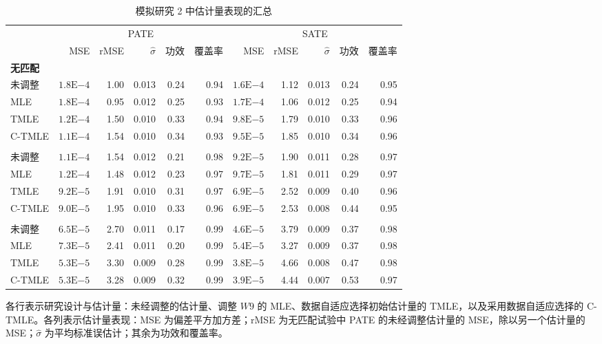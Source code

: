 \begin{table}[htbp]
 \centering
 \caption{模拟研究 2 中估计量表现的汇总}
 \label{tab:ch13-study2}
 \begingroup
 \small
 \setlength{\tabcolsep}{3pt}
 \renewcommand{\arraystretch}{1.16}
 \begin{tabular}{lrrrrrrrrrr}
  \toprule
  &\multicolumn{5}{c}{PATE}&\multicolumn{5}{c}{SATE}\\
  \cmidrule(lr){2-6}\cmidrule(lr){7-11}
  &MSE&rMSE&$\hat\sigma$&功效&覆盖率&MSE&rMSE&$\hat\sigma$&功效&覆盖率\\
  \midrule
  \multicolumn{11}{l}{\textbf{无匹配}}\\
  未调整&$1.8\mathrm E{-4}$&1.00&0.013&0.24&0.94&$1.6\mathrm E{-4}$&1.12&0.013&0.24&0.95\\
  MLE&$1.8\mathrm E{-4}$&0.95&0.012&0.25&0.93&$1.7\mathrm E{-4}$&1.06&0.012&0.25&0.94\\
  TMLE&$1.2\mathrm E{-4}$&1.50&0.010&0.33&0.94&$9.8\mathrm E{-5}$&1.79&0.010&0.33&0.96\\
  C-TMLE&$1.1\mathrm E{-4}$&1.54&0.010&0.34&0.93&$9.5\mathrm E{-5}$&1.85&0.010&0.34&0.96\\
  \addlinespace[.3em]
  \multicolumn{11}{l}{\textbf{匹配集 1}}\\
  未调整&$1.1\mathrm E{-4}$&1.54&0.012&0.21&0.98&$9.2\mathrm E{-5}$&1.90&0.011&0.28&0.97\\
  MLE&$1.2\mathrm E{-4}$&1.48&0.012&0.23&0.97&$9.7\mathrm E{-5}$&1.81&0.011&0.29&0.97\\
  TMLE&$9.2\mathrm E{-5}$&1.91&0.010&0.31&0.97&$6.9\mathrm E{-5}$&2.52&0.009&0.40&0.96\\
  C-TMLE&$9.0\mathrm E{-5}$&1.95&0.010&0.33&0.96&$6.9\mathrm E{-5}$&2.53&0.008&0.44&0.95\\
  \addlinespace[.3em]
  \multicolumn{11}{l}{\textbf{匹配集 2}}\\
  未调整&$6.5\mathrm E{-5}$&2.70&0.011&0.17&0.99&$4.6\mathrm E{-5}$&3.79&0.009&0.37&0.98\\
  MLE&$7.3\mathrm E{-5}$&2.41&0.011&0.20&0.99&$5.4\mathrm E{-5}$&3.27&0.009&0.37&0.98\\
  TMLE&$5.3\mathrm E{-5}$&3.30&0.009&0.28&0.99&$3.8\mathrm E{-5}$&4.66&0.008&0.47&0.98\\
  C-TMLE&$5.3\mathrm E{-5}$&3.28&0.009&0.32&0.99&$3.9\mathrm E{-5}$&4.44&0.007&0.53&0.97\\
  \bottomrule
 \end{tabular}
 \endgroup
 \par\smallskip
 \begin{minipage}{\linewidth}\footnotesize
 各行表示研究设计与估计量：未经调整的估计量、调整 $W9$ 的 MLE、数据自适应选择初始估计量的 TMLE，以及采用数据自适应选择的 C-TMLE。各列表示估计量表现：MSE 为偏差平方加方差；rMSE 为无匹配试验中 PATE 的未经调整估计量的 MSE，除以另一个估计量的 MSE；$\hat\sigma$ 为平均标准误估计；其余为功效和覆盖率。
 \end{minipage}
\end{table}

